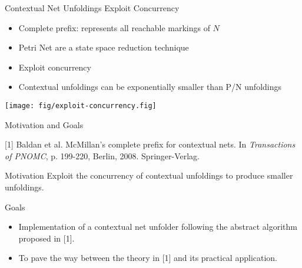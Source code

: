 \documentclass[table,red,11pt]{beamer}
\begin{document}
\begin{frame}{Contextual Net Unfoldings Exploit Concurrency}

\begin{itemize}
\item \alert{Complete prefix}: represents all reachable markings of $N$
\item Petri Net are a state space \alert{reduction} technique
\item Exploit concurrency
\item Contextual unfoldings can be exponentially smaller than P/N unfoldings
\end{itemize}

\vspace{1em}
\centerline{\texttt{[image: fig/exploit-concurrency.fig]}}

\end{frame}

\begin{frame}{Motivation and Goals}

[1] Baldan et al. McMillan's complete prefix for contextual nets.  In
\emph{Transactions of PNOMC}, p. 199-220, Berlin, 2008. Springer-Verlag.

\vspace{.3cm}

\begin{block}{Motivation}
Exploit the concurrency of contextual unfoldings to produce smaller unfoldings.
\end{block}

\begin{block}{Goals}
\begin{itemize}
\item Implementation of a contextual net unfolder following the abstract
algorithm proposed in [1].
\item To pave the way between the theory in [1] and its practical application.
\end{itemize}
\end{block}

\end{frame}
\end{document}
